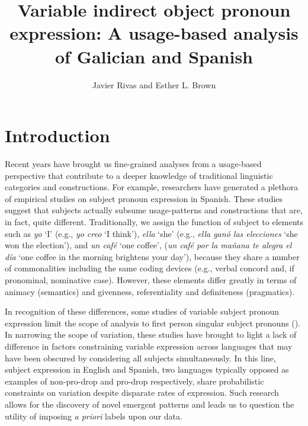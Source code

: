 \documentclass[output=paper]{langscibook}
\author{Javier Rivas\orcid{0000-0002-9327-9906}\affiliation{University of Colorado, Boulder} and Esther L. Brown\orcid{0000-0003-2824-8887}\affiliation{University of Colorado, Boulder}}
\title[Variable indirect object pronoun expression]
	  {Variable indirect object pronoun expression: A usage-based analysis of Galician and Spanish}
\begin{document}
\maketitle 

\section{Introduction}

Recent years have brought us fine-grained analyses from a usage-based perspective that contribute to a deeper knowledge of traditional linguistic categories and constructions. For example, researchers have generated a plethora of empirical studies on subject pronoun expression in Spanish. These studies suggest that subjects actually subsume usage{}-patterns and constructions that are, in fact, quite different. Traditionally, we assign the function of subject to elements such as \textit{yo} ‘I’ (e.g., \textit{yo creo} ‘I think’), \textit{ella} ‘she’ (e.g., \textit{ella ganó las elecciones} ‘she won the election’), and \textit{un café} ‘one coffee’, (\textit{un café por la mañana te alegra el día} ‘one coffee in the morning brightens your day’), because they share a number of commonalities including the same coding devices (e.g., verbal concord and, if pronominal, nominative case). However, these elements differ greatly in terms of animacy (semantics) and givenness, referentiality and definiteness (pragmatics).

In recognition of these differences, some studies of variable subject pronoun expression limit the scope of analysis to first person singular subject pronouns (\citealt{Morales1980, Bentivoglio1987, TravisTorresCacoullos2012,TravisCacoullos2021, Posio2013, TorresCacoullosTravis2014,TorresCacoullosTravis2018,TorresCacoullosTravis2019, Ramos2016, TravisKidd2017}). In narrowing the scope of variation, these studies have brought to light a lack of difference in factors constraining variable expression across languages that may have been obscured by considering all subjects simultaneously. In this line, subject expression in English and Spanish, two languages typically opposed as examples of non-pro-drop and pro-drop respectively, share probabilistic constraints on variation despite disparate rates of expression. Such research allows for the discovery of novel emergent patterns and leads us to question the utility of imposing \textit{a priori} labels upon our data.  
\end{document}

